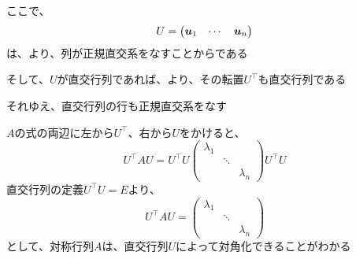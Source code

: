 \documentclass[../../../topic_linear-algebra]{subfiles}
\begin{document}
ここで、
\begin{equation*}
  U = \begin{pmatrix}
    \vb*{u}_1 & \cdots & \vb*{u}_n
  \end{pmatrix}
\end{equation*}
は、より、列が正規直交系をなすことからである

\br

そして、$U$が直交行列であれば、より、その転置$U^\top$も直交行列である

それゆえ、直交行列の行も正規直交系をなす

\br

$A$の式の両辺に左から$U^\top$、右から$U$をかけると、
\begin{equation*}
  U^\top A U  = U^\top U \begin{pmatrix}
    \lambda_1 &        &           \\
              & \ddots &           \\
              &        & \lambda_n
  \end{pmatrix} U^\top U
\end{equation*}
直交行列の定義$U^\top U = E$より、
\begin{equation*}
  U^\top A U =\begin{pmatrix}
    \lambda_1 &        &           \\
              & \ddots &           \\
              &        & \lambda_n
  \end{pmatrix}
\end{equation*}
として、対称行列$A$は、直交行列$U$によって対角化できることがわかる
\end{document}
